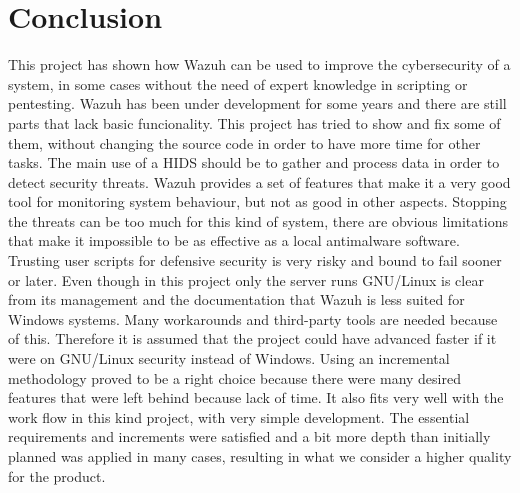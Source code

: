 \section{Conclusion}
This project has shown how Wazuh can be used to improve the cybersecurity of a system, in some cases without the need of expert knowledge in scripting or pentesting.
\linej
Wazuh has been under development for some years and there are still parts that lack basic funcionality.
This project has tried to show and fix some of them, without changing the source code in order to have more time for other tasks.
\linej
\linej
The main use of a HIDS should be to gather and process data in order to detect security threats.
Wazuh provides a set of features that make it a very good tool for monitoring system behaviour, but not as good in other aspects.
\linej
Stopping the threats can be too much for this kind of system, there are obvious limitations that make it impossible to be as effective as a local antimalware software.
Trusting user scripts for defensive security is very risky and bound to fail sooner or later.
\linej
\linej
Even though in this project only the server runs GNU/Linux is clear from its management and the documentation that Wazuh is less suited for Windows systems.
Many workarounds and third-party tools are needed because of this.
Therefore it is assumed that the project could have advanced faster if it were on GNU/Linux security instead of Windows.
\linej
\linej
Using an incremental methodology proved to be a right choice because there were many desired features that were left behind because lack of time.
It also fits very well with the work flow in this kind project, with very simple development.
The essential requirements and increments were satisfied and a bit more depth than initially planned was applied in many cases, resulting in what we consider a higher quality for the product.

